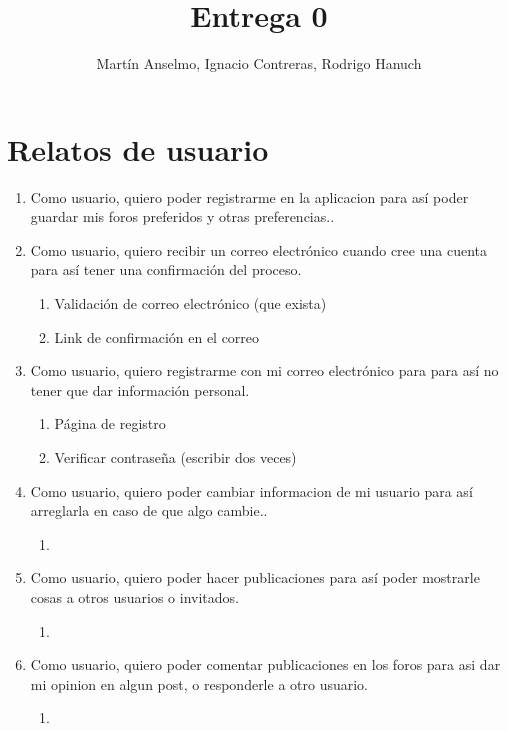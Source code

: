 \documentclass[12pt, letterpaper, notitlepage]{article}
\title{\textbf{Entrega 0}}
\author{Martín Anselmo, Ignacio Contreras, Rodrigo Hanuch}
\begin{document}
\clearpage\maketitle
\thispagestyle{empty}

\newpage

\section*{Relatos de usuario}
\newcommand{\story}[3]{Como {#1}, quiero {#2} para {#3}.}

\begin{enumerate}

	\item \story{usuario}{poder registrarme en la aplicacion}	
		{así poder guardar mis foros preferidos y otras preferencias.}
		

	\item \story{usuario}{recibir un correo electrónico cuando cree una cuenta}	
		{así tener una confirmación del proceso}
		\begin{enumerate}
			\item Validación de correo electrónico (que exista)
			\item Link de confirmación en el correo		
		\end{enumerate}
		
	\item \story{usuario}{registrarme con mi correo electrónico}{para así no tener que 
		dar información personal}
		\begin{enumerate}
			\item Página de registro
			\item Verificar contraseña (escribir dos veces)
		\end{enumerate}


	\item \story{usuario}{poder cambiar informacion de mi usuario}{así arreglarla en caso de que algo cambie.}
    	\begin{enumerate}
			\item
		\end{enumerate}
   
   
   \item \story{usuario}{poder hacer publicaciones}{así poder mostrarle cosas a otros usuarios o invitados}
       	\begin{enumerate}
			\item
		\end{enumerate}

   
   \item \story{usuario}{poder comentar publicaciones en los foros}{asi dar mi opinion en algun post, o responderle a otro usuario}
       	\begin{enumerate}
			\item
		\end{enumerate}


\end{enumerate}
\end{document}

